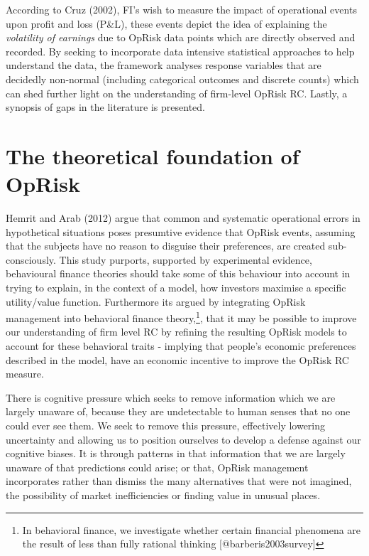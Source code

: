 \documentclass[]{DissertateUSU}
\let\rmarkdownfootnote\footnote%
\def\footnote{\protect\rmarkdownfootnote}
\begin{document}
According to Cruz (2002), FI's wish to measure the impact of operational
events upon profit and loss (P\&L), these events depict the idea of
explaining the \emph{volatility of earnings} due to OpRisk data points
which are directly observed and recorded. By seeking to incorporate data
intensive statistical approaches to help understand the data, the
framework analyses response variables that are decidedly non-normal
(including categorical outcomes and discrete counts) which can shed
further light on the understanding of firm-level OpRisk RC. Lastly, a
synopsis of gaps in the literature is presented.

\section{The theoretical foundation of OpRisk}
\label{sec:The theoretical foundation of OpRisk}

Hemrit and Arab (2012) argue that common and systematic operational
errors in hypothetical situations poses presumtive evidence that OpRisk
events, assuming that the subjects have no reason to disguise their
preferences, are created sub-consciously. This study purports, supported
by experimental evidence, behavioural finance theories should take some
of this behaviour into account in trying to explain, in the context of a
model, how investors maximise a specific utility/value function.
Furthermore its argued by integrating OpRisk management into behavioral
finance
theory,\footnote{In behavioral finance, we investigate whether certain financial phenomena are the result of less than fully rational thinking [@barberis2003survey]},
that it may be possible to improve our understanding of firm level RC by
refining the resulting OpRisk models to account for these behavioral
traits - implying that people's economic preferences described in the
model, have an economic incentive to improve the OpRisk RC measure.
\medskip

There is cognitive pressure which seeks to remove information which we
are largely unaware of, because they are undetectable to human senses
that no one could ever see them. We seek to remove this pressure,
effectively lowering uncertainty and allowing us to position ourselves
to develop a defense against our cognitive biases. It is through
patterns in that information that we are largely unaware of that
predictions could arise; or that, OpRisk management incorporates rather
than dismiss the many alternatives that were not imagined, the
possibility of market inefficiencies or finding value in unusual places.
\medskip
\end{document}
